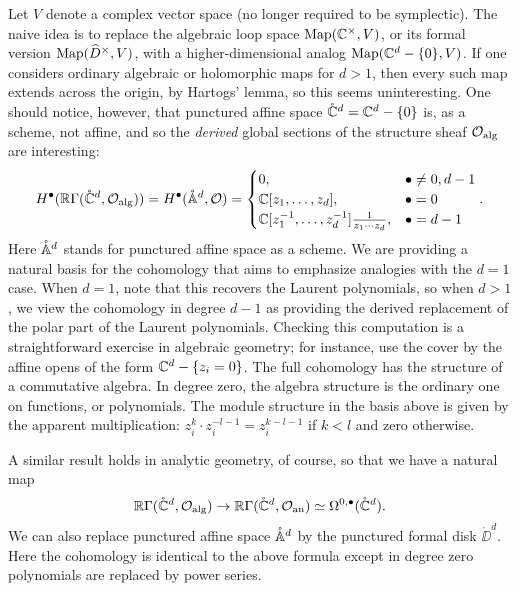 \documentclass[11pt]{amsart}
\begin{document}
Let $V$ denote a complex vector space (no longer required to be symplectic).
The naive idea is to replace the algebraic loop space $\Map(\CC^\times,  V)$, or its formal version $\Map(\Hat{D}^\times, V)$, with a higher-dimensional analog $\Map(\CC^d -\{0\}, V)$.
If one considers ordinary algebraic or holomorphic maps for $d > 1$, 
then every such map extends across the origin, by Hartogs' lemma,
so this seems uninteresting.
One should notice, however, that punctured affine space $\mathring{\CC}^d = \CC^d -\{0\}$ is, as a scheme, not affine, 
and so the {\em derived} global sections of the structure sheaf $\cO_{\rm alg}$ are interesting:
\[
H^\bu(\RR \Gamma(\mathring{\CC}^d, \cO_{\rm alg})) = H^\bu (\mathring{\AA}^d, \cO) 
= \begin{cases} 
0, & \bu \neq 0, d-1 \\ 
\CC[z_1,\ldots,z_d], & \bu = 0 \\ 
\CC[z_1^{-1},\ldots,z_d^{-1}] \frac{1}{z_1 \cdots z_d}, & \bu = d-1 
\end{cases} .
\]
Here $\mathring{\AA}^d$ stands for punctured affine space as a scheme. 
We are providing a natural basis for the cohomology 
that aims to emphasize analogies with the $d=1$ case.
When $d=1$, note that this recovers the Laurent polynomials,
so when $d > 1$, 
we view the cohomology in degree $d-1$ as providing the derived replacement of the polar part of the Laurent polynomials.
Checking this computation is a straightforward exercise in algebraic geometry;
for instance, use the cover by the affine opens of the form $\CC^d - \{z_i =0\}$.
The full cohomology has the structure of a commutative algebra. 
In degree zero, the algebra structure is the ordinary one on functions, or polynomials.
The module structure in the basis above is given by the apparent multiplication: $z_i^k \cdot z_i^{-l-1} = z_i^{k-l-1}$ if $k < l$ and zero otherwise.

A similar result holds in analytic geometry, of course,
so that we have a natural map
\[
\RR \Gamma(\mathring{\CC}^d, \cO_{\rm alg}) \to \RR \Gamma(\mathring{\CC}^d, \cO_{\rm an}) \simeq \Omega^{0,\bu}(\mathring{\CC}^d).
\]
We can also replace punctured affine space $\mathring{\AA}^d$ by the punctured formal disk
$\mathring{\DD}^d$.
Here the cohomology is identical to the above formula except in degree zero polynomials are replaced by power series.
\end{document}
